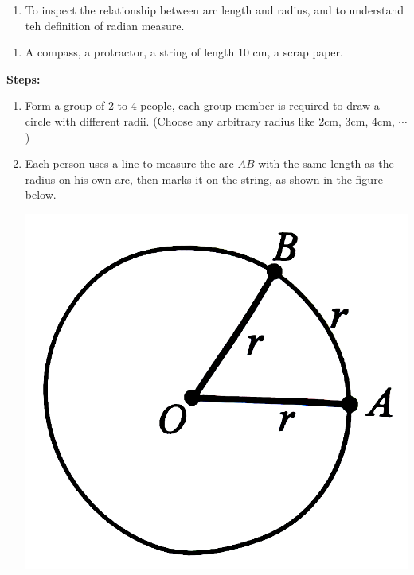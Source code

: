 \documentclass{report}
\begin{document}
\begin{explore}
	
	\begin{enumerate}[label=\textbf{Aim:} ,leftmargin=4.5em]
		\item To inspect the relationship between arc length and radius, and to understand teh definition of radian measure.
	\end{enumerate}
	\vspace{-2em}
	\begin{enumerate}[label=\textbf{Materials Needed:} ,leftmargin=2em, align=left]
		\item A compass, a protractor, a string of length 10 cm, a scrap paper.
	\end{enumerate}
	\vspace{-1em}
	
	\textbf{Steps:}
	\vspace{-1em}
	\begin{enumerate}
		\item Form a group of 2 to 4 people, each group member is required to draw a circle with different radii. (Choose any arbitrary radius like 2cm, 3cm, 4cm, $\cdots$)
		              
		\item Each person uses a line to measure the arc $AB$ with the same length as the radius on his own arc, then marks it on the string, as shown in the figure below.
		              
		      \begin{center}
		      	\includegraphics[scale=0.1]{assets/8-3.png}
		      \end{center}
		              

\end{enumerate}
\end{explore}
\end{document}
